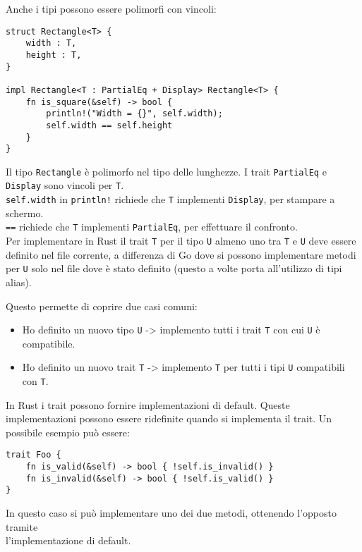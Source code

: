 \documentclass{article}
\begin{document}
\pagebreak

Anche i tipi possono essere polimorfi con vincoli:
\begin{tcolorbox}
\begin{verbatim}
struct Rectangle<T> {
    width : T,
    height : T,
}

impl Rectangle<T : PartialEq + Display> Rectangle<T> {
    fn is_square(&self) -> bool {
        println!("Width = {}", self.width);
        self.width == self.height
    }
}
\end{verbatim}
\end{tcolorbox}

Il tipo \texttt{Rectangle} è polimorfo nel tipo delle lunghezze. I trait \texttt{PartialEq} e \texttt{Display} sono vincoli per \texttt{T}.\\
\texttt{self.width} in \texttt{println!} richiede che \texttt{T} implementi \texttt{Display}, per stampare a schermo.\\
\texttt{==} richiede che \texttt{T} implementi \texttt{PartialEq}, per effettuare il confronto.\vspace{14pt}\\
Per implementare in Rust il trait \texttt{T} per il tipo \texttt{U} almeno uno tra \texttt{T} e \texttt{U} deve essere definito nel file corrente, a differenza di Go dove si possono implementare metodi per \texttt{U} solo nel file dove è stato definito (questo a volte porta all'utilizzo di tipi alias).

Questo permette di coprire due casi comuni:
\begin{itemize}
    \item Ho definito un nuovo tipo \texttt{U} -> implemento tutti i trait \texttt{T} con cui \texttt{U} è compatibile.
    \item Ho definito un nuovo trait \texttt{T} -> implemento \texttt{T} per tutti i tipi \texttt{U} compatibili con \texttt{T}.
\end{itemize}
\vspace{14pt}
In Rust i trait possono fornire implementazioni di default. Queste implementazioni possono essere ridefinite quando si implementa il trait. Un possibile esempio può essere:
\begin{tcolorbox}
\begin{verbatim}
trait Foo {
    fn is_valid(&self) -> bool { !self.is_invalid() }
    fn is_invalid(&self) -> bool { !self.is_valid() }
}
\end{verbatim}
\end{tcolorbox}
In questo caso si può implementare uno dei due metodi, ottenendo l'opposto tramite\\
l'implementazione di default.
\end{document}

